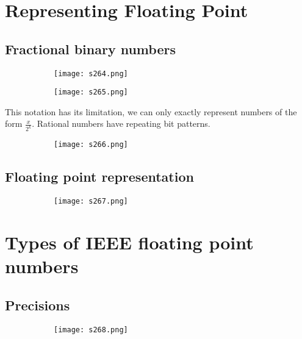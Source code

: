 \documentclass[8pt]{extreport}
\begin{document}
\section{Representing Floating Point}

\subsection{Fractional binary numbers}
\begin{figure}[H]
\centering
\begin{subfigure}[b]{0.4\linewidth}
\texttt{[image: s264.png]}
\end{subfigure}
\begin{subfigure}[b]{0.4\linewidth}
\texttt{[image: s265.png]}
\end{subfigure}
\end{figure}
This notation has its limitation, we can only exactly represent numbers of the form $\frac{x}{2^k}$. Rational numbers have repeating bit patterns.
\begin{figure}[H]
\centering
\begin{subfigure}[b]{0.4\linewidth}
\texttt{[image: s266.png]}
\end{subfigure}
\end{figure}

\subsection{Floating point representation}
\begin{figure}[H]
\centering
\begin{subfigure}[b]{0.4\linewidth}
\texttt{[image: s267.png]}
\end{subfigure}
\end{figure}

\section{Types of IEEE floating point numbers}

\subsection{Precisions}
\begin{figure}[H]
\centering
\begin{subfigure}[b]{0.4\linewidth}
\texttt{[image: s268.png]}
\end{subfigure}
\end{figure}
\end{document}
